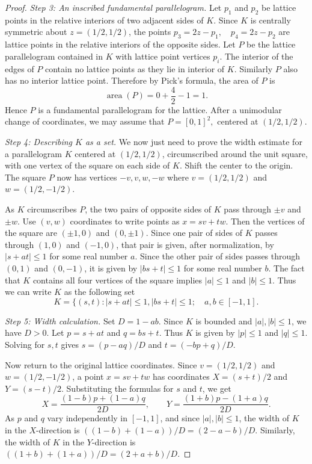 \documentclass[11pt,reqno]{amsart}
\numberwithin{equation}{section}
\numberwithin{equation}{section}
\theoremstyle{definition}
\begin{document}
\begin{proof}
\emph{Step 3: An inscribed fundamental parallelogram.}
Let \(p_1\) and \(p_2\) be lattice points in the relative interiors of two adjacent sides of \(K\). Since \(K\) is centrally symmetric about \(z=(1/2,1/2)\), the points \(p_3=2z-p_1,\quad p_4=2z-p_2\) are lattice points in the relative interiors of the opposite sides. Let $P$ be the lattice parallelogram contained in \(K\) with lattice point vertices $p_i$. The interior of the edges of \(P\) contain no lattice points as they lie in interior of $K$. Similarly $P$ also has no interior lattice point. Therefore by Pick's formula, the area of $P$ is
\[
\operatorname{area}(P)=0+\frac{4}{2}-1=1.
\]
Hence \(P\) is a fundamental parallelogram for the lattice. After a unimodular change of coordinates, we may assume that \(P=[0,1]^2,\) centered at \((1/2,1/2)\).

\emph{Step 4: Describing $K$ as a set.}
We now just need to prove the width estimate for a parallelogram \(K\) centered at \((1/2,1/2)\), circumscribed around the unit square, with one vertex of the square on each side of \(K\). Shift the center to the origin. The square $P$ now has vertices $-v,v,w,-w$ where $v=(1/2,1/2)$ and $w=(1/2,-1/2)$. 

As $K$ circumscribes $P$, the two pairs of opposite sides of \(K\) pass through \(\pm v\) and \(\pm w\). Use $(v,w)$ coordinates to write points as \(x=sv+tw\). Then the vertices of the square are \((\pm1,0)\) and \((0,\pm1)\). Since one pair of sides of \(K\) passes through \((1,0)\) and \((-1,0)\), that pair is given, after normalization, by \(|s+at|\le1\) for some real number \(a\). Since the other pair of sides passes through \((0,1)\) and \((0,-1)\), it is given by \(|bs+t|\le1\) for some real number \(b\). The fact that \(K\) contains all four vertices of the square implies \(|a|\le1\) and \(|b|\le1.\) Thus we can write $K$ as the following set \[K = \{(s,t): |s+at| \leq 1, |bs+t| \leq 1; \quad a,b \in [-1,1].\]

\emph{Step 5: Width calculation.}
Set \(D=1-ab\). Since \(K\) is bounded and \(|a|,|b|\le1\), we have \(D>0\). Let \(p=s+at\) and \(q=bs+t\). Thus \(K\) is given by \(|p|\le1\) and \(|q|\le1\).  Solving for \(s,t\) gives \(s=(p-aq)/D\) and \(t=(-bp+q)/D\).

Now return to the original lattice coordinates. Since \(v=(1/2,1/2)\) and \(w=(1/2,-1/2)\), a point \(x=sv+tw\) has coordinates \(X=(s+t)/2\) and \(Y=(s-t)/2\). Substituting the formulas for \(s\) and \(t\), we get
\[
X=\frac{(1-b)p+(1-a)q}{2D},
\qquad
Y=\frac{(1+b)p-(1+a)q}{2D}.
\]
As \(p\) and \(q\) vary independently in \([-1,1]\), and since \(|a|,|b|\le1\), the width of \(K\) in the \(X\)-direction is \(((1-b)+(1-a))/D=(2-a-b)/D\). Similarly, the width of \(K\) in the \(Y\)-direction is \(((1+b)+(1+a))/D=(2+a+b)/D\).


\end{proof}
\end{document}
